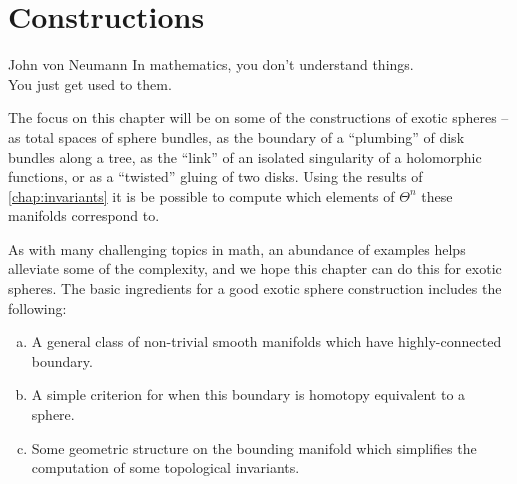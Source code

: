 \chapter{Constructions}\label{chap:constructions}
%

\begin{epigraph}{20em}{John von Neumann}
	In mathematics, you don't understand things.\\
	You just get used to them.
\end{epigraph}

The focus on this chapter will be on some of the constructions of exotic spheres -- as total spaces of sphere bundles, as the boundary of a ``plumbing'' of disk bundles along a tree, as the ``link'' of an isolated singularity of a holomorphic functions, or as a ``twisted'' gluing of two disks. Using the results of \cref{chap:invariants} it is be possible to compute which elements of $\Theta^n$ these manifolds correspond to.

As with many challenging topics in math, an abundance of examples helps alleviate some of the complexity, and we hope this chapter can do this for exotic spheres.
The basic ingredients for a good exotic sphere construction includes the following:
\begin{enumerate}[(a)]
	\item A general class of non-trivial smooth manifolds which have highly-connected boundary.
	\item A simple criterion for when this boundary is homotopy equivalent to a sphere.
	\item Some geometric structure on the bounding manifold which simplifies the computation of some topological invariants.
\end{enumerate}





